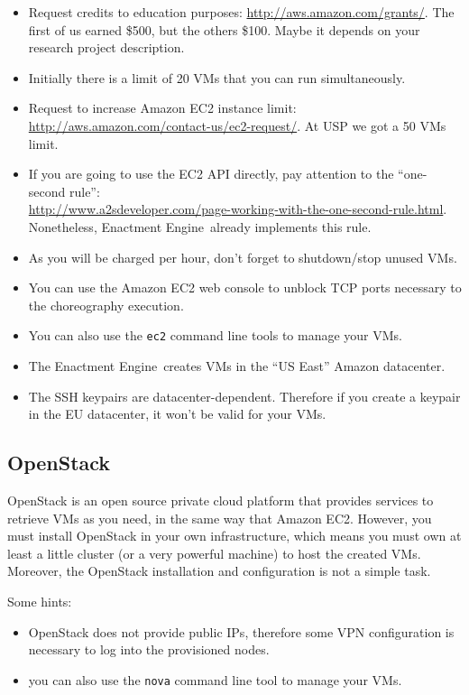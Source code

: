 \documentclass[a4paper, 10pt]{article}
\newcommand{\ee}{Enactment Engine}
\begin{document}
\begin{itemize}
\item Request credits to education purposes: \url{http://aws.amazon.com/grants/}. The first of us earned \$500, but the others \$100. Maybe it depends on your research project description.
\item Initially there is a limit of 20 VMs that you can run simultaneously.
\item Request to increase Amazon EC2 instance limit: \url{http://aws.amazon.com/contact-us/ec2-request/}. At USP we got a 50 VMs limit.
\item If you are going to use the EC2 API directly, pay attention to the ``one-second rule'': \\ \url{http://www.a2sdeveloper.com/page-working-with-the-one-second-rule.html}. Nonetheless, \ee\ already implements this rule.
\item As you will be charged per hour, don't forget to shutdown/stop unused VMs.
\item You can use the Amazon EC2 web console to unblock TCP ports necessary to the choreography execution.
\item You can also use the \texttt{ec2} command line tools to manage your VMs.
\item The \ee\ creates VMs in the ``US East'' Amazon datacenter.
\item The SSH keypairs are datacenter-dependent. Therefore if you create a keypair in the EU
datacenter, it won't be valid for your VMs.
\end{itemize}

\subsection{OpenStack}

OpenStack is an open source private cloud platform that provides services to retrieve VMs as you need, in the same way that Amazon EC2. However, you must install OpenStack in your own infrastructure, which means you must own at least a little cluster (or a very powerful machine) to host the created VMs. Moreover, the OpenStack installation and configuration is not a simple task.

Some hints:

\begin{itemize}
\item OpenStack does not provide public IPs, therefore some VPN configuration is necessary to log into the provisioned nodes.
\item you can also use the \texttt{nova} command line tool to manage your VMs.
\end{itemize}
\end{document}
